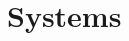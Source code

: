 \documentclass[10pt]{extarticle}
\numberwithin{equation}{subsection}
\begin{document}
\tableofcontents

\newpage
\printnomenclature


\newpage
\section{Systems}


\end{document}
